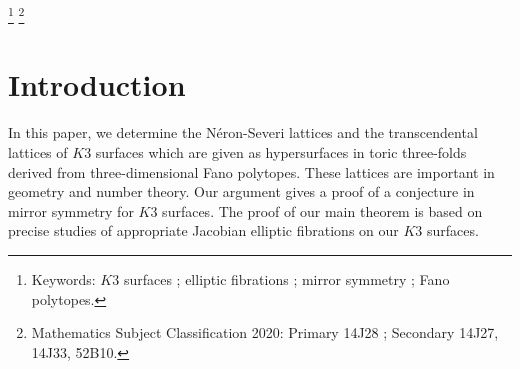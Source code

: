 \documentclass[10pt]{article}
\begin{document}
\maketitle



\begin{abstract}
We determine the N\'eron-Severi lattices of $K3$ hypersurfaces with large Picard number in toric three-folds derived from Fano polytopes.
On each $K3$ surface, 
we introduce a particular elliptic fibration.
In the proof of the main theorem,
we show that the N\'eron-Severi lattice of each $K3$ surface is generated by a general fibre, sections and appropriately selected components of the singular fibres of our elliptic fibration.
Our argument gives a certain proof of  the Dolgachev conjecture  for  Fano polytopes, which is a conjecture on mirror symmetry for  $K3$ surfaces.
\end{abstract}


\footnote[0]{Keywords:  $K3$ surfaces ; elliptic fibrations ; mirror symmetry ; Fano polytopes.  }
\footnote[0]{Mathematics Subject Classification 2020:  Primary 14J28 ; Secondary  14J27, 14J33, 52B10.}
\setlength{\baselineskip}{14 pt}



\section*{Introduction}
In this paper,
we  determine the N\'eron-Severi lattices and the transcendental lattices of $K3$ surfaces
which are given as hypersurfaces in toric three-folds derived from three-dimensional Fano polytopes.
These lattices are important in geometry and number theory.
Our argument  gives a  proof of a conjecture in mirror symmetry for $K3$ surfaces.
The proof of our main theorem is based on  precise studies of  appropriate Jacobian elliptic fibrations on our $K3$ surfaces.
\end{document}
